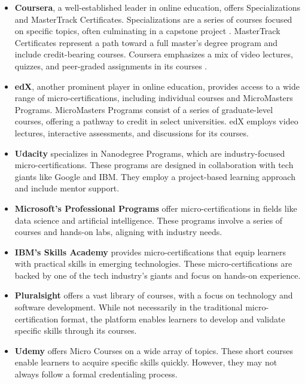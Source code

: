 \documentclass{article}
\begin{document}
\begin{multicols}{2}
    \begin{itemize}
        \item \textbf{Coursera}, a well-established leader in online education, offers Specializations and MasterTrack Certificates. Specializations are a series of courses focused on specific topics, often culminating in a capstone project \cite{CourseraSpecializations}. MasterTrack Certificates represent a path toward a full master's degree program and include credit-bearing courses. Coursera emphasizes a mix of video lectures, quizzes, and peer-graded assignments in its courses \cite{CourseraMasterTrack}.
        \item \textbf{edX}, another prominent player in online education, provides access to a wide range of micro-certifications, including individual courses and MicroMasters Programs. MicroMasters Programs consist of a series of graduate-level courses, offering a pathway to credit in select universities. edX employs video lectures, interactive assessments, and discussions for its courses.
        \item \textbf{Udacity} specializes in Nanodegree Programs, which are industry-focused micro-certifications. These programs are designed in collaboration with tech giants like Google and IBM. They employ a project-based learning approach and include mentor support.
        \item \textbf{Microsoft's Professional Programs} offer micro-certifications in fields like data science and artificial intelligence. These programs involve a series of courses and hands-on labs, aligning with industry needs.
        \item \textbf{IBM's Skills Academy} provides micro-certifications that equip learners with practical skills in emerging technologies. These micro-certifications are backed by one of the tech industry's giants and focus on hands-on experience.
        \item \textbf{Pluralsight} offers a vast library of courses, with a focus on technology and software development. While not necessarily in the traditional micro-certification format, the platform enables learners to develop and validate specific skills through its courses.
        \item \textbf{Udemy} offers Micro Courses on a wide array of topics. These short courses enable learners to acquire specific skills quickly. However, they may not always follow a formal credentialing process.
    \end{itemize}


\end{multicols}
\end{document}
